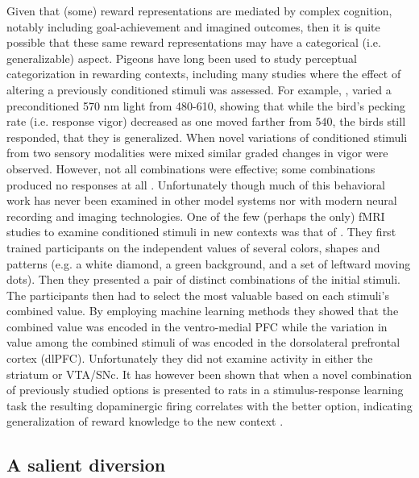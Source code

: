\documentclass[doc,12pt]{apa}        %
\begin{document}
Given that (some) reward representations are mediated by complex cognition, notably including goal-achievement and imagined outcomes,  then it is quite possible that these same reward representations may have a categorical (i.e. generalizable) aspect.  Pigeons have long been used to study perceptual categorization in rewarding contexts, including many studies where the effect of altering a previously conditioned stimuli was assessed.  For example, , varied a preconditioned 570 nm light from 480-610, showing that while the bird's pecking rate (i.e. response vigor) decreased as one moved farther from 540, the birds still responded, that they is generalized.  When novel variations of conditioned stimuli from two sensory modalities were mixed similar graded changes in vigor were observed. However, not all combinations were effective; some combinations produced no responses at all \cite{Blough:2001p8408,Simmons:2008p8405,Urcuioli:2001p8359}.  Unfortunately though much of this behavioral work has never been examined in other model systems nor with modern neural recording and imaging technologies.  One of the few (perhaps the only) fMRI studies to examine conditioned stimuli in new contexts was that of . They first trained participants on the independent values of several colors, shapes and patterns (e.g. a white diamond, a green background, and a set of leftward moving dots).  Then they presented a pair of distinct combinations of the initial stimuli.  The participants then had to select the most valuable based on each stimuli's combined value.  By employing machine learning methods they showed that the combined value was encoded in the ventro-medial PFC while the variation in value among the combined stimuli of was encoded in the dorsolateral prefrontal cortex (dlPFC).  Unfortunately they did not examine activity in either the striatum or VTA/SNc.  It has however been shown that when a novel combination of previously studied options is presented to rats in a stimulus-response learning task the resulting dopaminergic firing correlates with the better option, indicating generalization of reward knowledge to the new context \cite{Roesch:2007p2519}.

\subsection{A salient diversion} %
\label{sub:sidebar_for_saliance}

\end{document}
